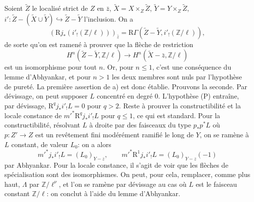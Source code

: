 \documentclass[11pt]{article}
\newcommand{\R}{\mathrm{R}}\newcommand{\RHomCore}{\mathrm{RHom}}
\providecommand{\R}{\mathrm R}
\begin{document}
Soient $\widetilde Z$ le localisé strict de $Z$ en $\bar z$, $\widetilde X=X\times_Z\widetilde Z$, $\widetilde Y=Y\times_Z\widetilde Z$, $i':\widetilde Z-(\widetilde X\cup\widetilde Y)\hookrightarrow \widetilde Z-\widetilde Y$ l'inclusion. On a
\[
(\R j_*(i'_!(\mathbb Z/\ell)))_{\bar z}
=\R\Gamma(\widetilde Z-\widetilde Y,i'_!(\mathbb Z/\ell)),
\]
de sorte qu'on est ramené à prouver que la flèche de restriction
\[
H^n(\widetilde Z-\widetilde Y,\mathbb Z/\ell)
\longrightarrow
H^n(\widetilde X-\bar z,\mathbb Z/\ell)
\]
est un isomorphisme pour tout $n$. Or, pour $n\le1$, c'est une conséquence du lemme d'Abhyankar, et pour $n>1$ les deux membres sont nuls par l'hypothèse de pureté. La première assertion de a) est donc établie. Prouvons la seconde. Par dévissage, on peut supposer $L$ concentré en degré $0$. L'hypothèse (P) entraîne, par dévissage, $\R^qj_*i'_!L=0$ pour $q>2$. Reste à prouver la constructibilité et la locale constance de $m'^*\R^qj_*i'_!L$ pour $q\le1$, ce qui est standard. Pour la constructibilité, résolvant $L$ à droite par des faisceaux du type $p_*p^*L$ où $p:Z'\to Z$ est un revêtement fini modérément ramifié le long de $Y$, on se ramène à $L$ constant, de valeur $L_0$: on a alors
\[
m'^*j_*i'_!L=(L_0)_{Y-z},
\qquad
m'^*\R^1j_*i'_!L=(L_0)_{Y-z}(-1)
\]
par Abhyankar. Pour la locale constance, il s'agit de voir que les flèches de spécialisation sont des isomorphismes. On peut, pour cela, remplacer, comme plus haut, $\Lambda$ par $\mathbb Z/\ell^\nu$, et l'on se ramène par dévissage au cas où $L$ est le faisceau constant $\mathbb Z/\ell$: on conclut à l'aide du lemme d'Abhyankar.
\end{document}
